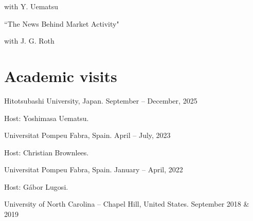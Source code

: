 \documentclass[10pt]{article}
\begin{document}
	\hspace{2em} with  Y. Uematsu

	\smallskip

	\hspace{1em} ``The News Behind Market Activity"
	
	\hspace{2em} with  J. G. Roth
	
	\smallskip
	
%	
%	
%	
	
	\section*{Academic visits}
	\vspace{-0.5em}
	
	\smallskip
	
	\hspace{1em} Hitotsubashi University, Japan. September -- December, 2025
	
	\hspace{2em} Host: Yoshimasa Uematsu.
	
	\smallskip
	
	\hspace{1em} Universitat Pompeu Fabra, Spain. April -- July, 2023
	
	\hspace{2em} Host: Christian Brownlees.
	
	\smallskip
	
	\hspace{1em} Universitat Pompeu Fabra, Spain. January -- April, 2022
	
	\hspace{2em} Host: Gábor Lugosi.
	
	\smallskip
	
	\hspace{1em} University of North Carolina – Chapel Hill, United States. September 2018 \& 2019
	
\end{document}
